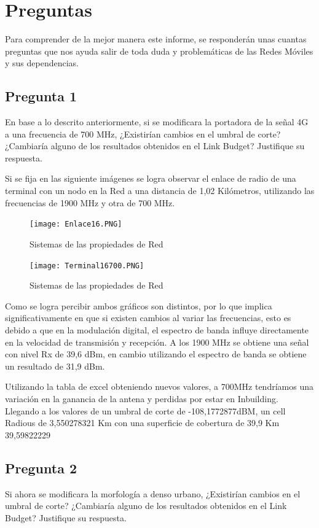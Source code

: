 \documentclass[Article, letterpaper,12pt]{article}
\begin{document}
\section{Preguntas}
Para comprender de la mejor manera este informe, se responderán unas cuantas preguntas que nos ayuda salir de toda duda y problemáticas de las Redes Móviles y sus dependencias.


\subsection{Pregunta 1}
En base a lo descrito anteriormente, si se modificara la portadora de la señal 4G a una frecuencia de 700 MHz, ¿Existirían
cambios en el umbral de corte? ¿Cambiaría alguno de los resultados obtenidos en el Link Budget? Justifique su respuesta.

Si se fija en las siguiente imágenes se logra observar el enlace de radio de una terminal con un nodo en la Red a una distancia de 1,02 Kilómetros, utilizando las frecuencias de 1900 MHz y otra de 700 MHz.

\begin{figure}[H]
    \centering
    \texttt{[image: Enlace16.PNG]}
    \caption{Sistemas de las propiedades de Red}
    \label{fig:my_label}
\end{figure}

\begin{figure}[H]
    \centering
    \texttt{[image: Terminal16700.PNG]}
    \caption{Sistemas de las propiedades de Red}
    \label{fig:my_label}
\end{figure}

Como se logra percibir ambos gráficos son distintos, por lo que implica significativamente en que si existen cambios al variar las frecuencias, esto es debido a que en la modulación digital, el espectro de banda influye directamente en la velocidad de transmisión y recepción. A los 1900 MHz se obtiene una señal con nivel Rx de 39,6 dBm, en cambio utilizando el espectro de banda se obtiene un resultado de 31,9 dBm.

Utilizando la tabla de excel obteniendo nuevos valores, a 700MHz tendríamos una variación en la ganancia de la antena y perdidas por estar en Inbuilding. Llegando a los valores de un umbral de corte de -108,1772877dBM, un cell 
Radious de 3,550278321 Km con una superficie de cobertura de 39,9 Km
39,59822229

\subsection{Pregunta 2}
Si ahora se modificara la morfología a denso urbano, ¿Existirían cambios en el umbral de corte? ¿Cambiaría alguno de los
resultados obtenidos en el Link Budget? Justifique su respuesta.
\end{document}
